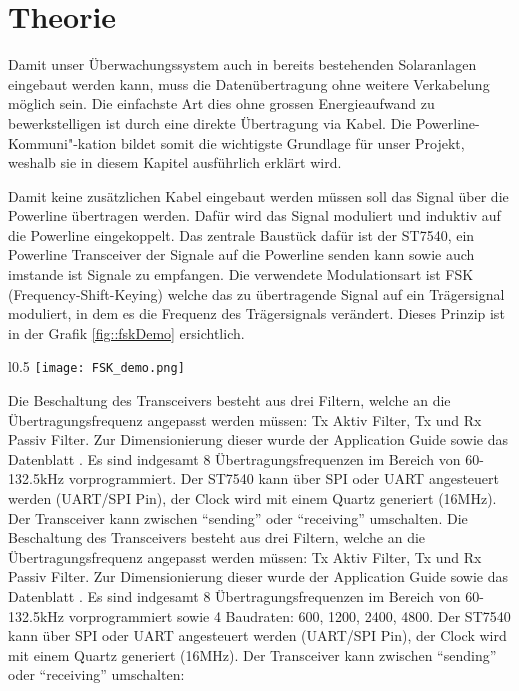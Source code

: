 \section{Theorie}

Damit unser Überwachungssystem auch in bereits bestehenden Solaranlagen eingebaut werden kann, muss die Datenübertragung ohne weitere Verkabelung möglich sein. Die einfachste Art dies ohne grossen Energieaufwand zu bewerkstelligen ist durch eine direkte Übertragung via Kabel. Die Powerline-Kommuni"-kation bildet somit die wichtigste Grundlage für unser Projekt, weshalb sie in diesem Kapitel ausführlich erklärt wird. 


Damit keine zusätzlichen Kabel eingebaut werden müssen soll das Signal über die Powerline übertragen werden. Dafür wird das Signal moduliert und induktiv auf die Powerline eingekoppelt. Das zentrale Baustück dafür ist der ST7540, ein Powerline Transceiver der Signale auf die Powerline senden kann sowie auch imstande ist Signale zu empfangen. Die verwendete Modulationsart ist FSK (Frequency-Shift-Keying) welche das zu übertragende Signal auf ein Trägersignal moduliert, in dem es die Frequenz des Trägersignals verändert. Dieses Prinzip ist in der Grafik \ref{fig::fskDemo} ersichtlich.


\begin{wrapfigure}{l}{0.5\textwidth}
\centering
\texttt{[image: FSK\_demo.png]}%
\caption{Prinzip der FSK Modulation \cite{fskDemo_wiki} }
\label{fig::fskDemo}
\end{wrapfigure}

Die Beschaltung des Transceivers besteht aus drei Filtern, welche an die Übertragungsfrequenz angepasst werden müssen: Tx Aktiv Filter, Tx und Rx Passiv Filter. Zur Dimensionierung dieser wurde der Application Guide \cite{Applic_Guide_ST7540} sowie das Datenblatt \cite{Datasheet_ST7540}. Es sind indgesamt 8 Übertragungsfrequenzen im Bereich von 60-132.5kHz vorprogrammiert. Der ST7540 kann über SPI oder UART angesteuert werden (UART/SPI Pin), der Clock wird mit einem Quartz generiert (16MHz). Der Transceiver kann zwischen ``sending'' oder ``receiving'' umschalten.
Die Beschaltung des Transceivers besteht aus drei Filtern, welche an die Übertragungsfrequenz angepasst werden müssen: Tx Aktiv Filter, Tx und Rx Passiv Filter. Zur Dimensionierung dieser wurde der Application Guide \cite{Applic_Guide_ST7540} sowie das Datenblatt \cite{Datasheet_ST7540}. Es sind indgesamt 8 Übertragungsfrequenzen im Bereich von 60-132.5kHz vorprogrammiert sowie 4 Baudraten: 600, 1200, 2400, 4800. Der ST7540 kann über SPI oder UART angesteuert werden (UART/SPI Pin), der Clock wird mit einem Quartz generiert (16MHz). Der Transceiver kann zwischen ``sending'' oder ``receiving'' umschalten:

